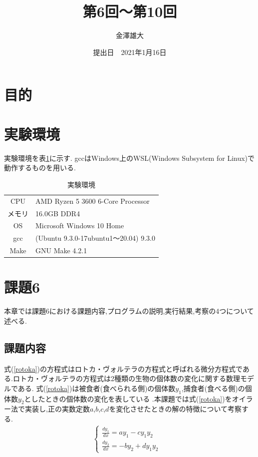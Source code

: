 \documentclass[a4j]{jarticle}
\title{第6回～第10回}
\date{提出日　2021年1月16日}
\author{金澤雄大}
\begin{document}
    \maketitle
    \thispagestyle{empty}
    \clearpage
    \addtocounter{page}{-1}

    \section{目的}

    \section{実験環境}
      実験環境を表\ref{env}に示す. gccはWindows上のWSL(Windows Subsystem for Linux)で動作するものを用いる.
      \begin{table}[H]
        \caption{実験環境}
      \label{env}
      \begin{center}
          \begin{tabular}{c|l}\hline
            CPU & AMD Ryzen 5 3600 6-Core Processor \\ 
            メモリ & 16.0GB DDR4 \\
            OS & Microsoft Windows 10 Home \\
            gcc & (Ubuntu 9.3.0-17ubuntu1～20.04) 9.3.0 \\
            Make & GNU Make 4.2.1 \\ \hline
          \end{tabular}
      \end{center}
      \end{table}

      \section{課題6}
      本章では課題6における課題内容,プログラムの説明,実行結果,考察の4つについて述べる.
      \subsection{課題内容}
      式(\ref{rotoka})の方程式はロトカ・ヴォルテラの方程式と呼ばれる微分方程式である.ロトカ・ヴォルテラの方程式は2種類の生物の個体数の変化に関する数理モデルである.
      式(\ref{rotoka})は被食者(食べられる側)の個体数$y_1$,捕食者(食べる側)の個体数$y_2$としたときの個体数の変化を表している
      .本課題では式(\ref{rotoka})をオイラー法で実装し,正の実数定数$a$,$b$,$c$,$d$を変化させたときの解の特徴について考察する.
      \begin{eqnarray}
      \begin{cases}
        \frac{dy_1}{dx} = ay_1-cy_1y_2 & \\
        \frac{dy_2}{dx} = -by_2+dy_1y_2 &
      \end{cases}
      \label{rotoka}
    \end{eqnarray}
\end{document}
